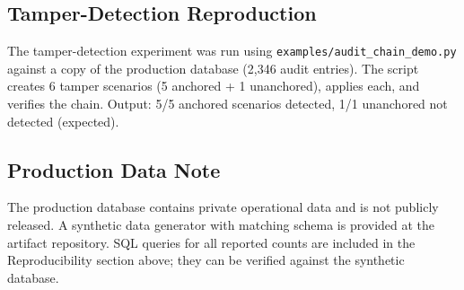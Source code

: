 \documentclass[11pt]{article}
\begin{document}
\subsection{Tamper-Detection Reproduction}

The tamper-detection experiment was run using \texttt{examples/audit\_chain\_demo.py} against a copy of the production database (2{,}346 audit entries). The script creates 6 tamper scenarios (5 anchored + 1 unanchored), applies each, and verifies the chain. Output: 5/5 anchored scenarios detected, 1/1 unanchored not detected (expected).

\subsection{Production Data Note}

The production database contains private operational data and is not publicly released. A synthetic data generator with matching schema is provided at the artifact repository. SQL queries for all reported counts are included in the Reproducibility section above; they can be verified against the synthetic database.
\end{document}
